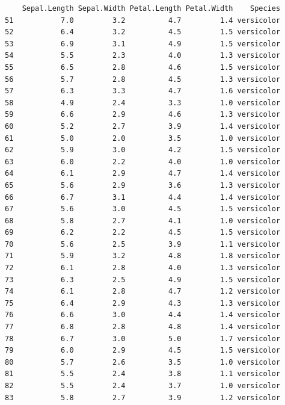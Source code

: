\documentclass[
  letterpaper,
]{book}
\newenvironment{Shaded}{\begin{snugshade}}{\end{snugshade}}
\newcommand{\NormalTok}[1]{\textcolor[rgb]{0.00,0.23,0.31}{#1}}
\newcommand{\SpecialCharTok}[1]{\textcolor[rgb]{0.37,0.37,0.37}{#1}}
\newcommand{\StringTok}[1]{\textcolor[rgb]{0.13,0.47,0.30}{#1}}
\begin{document}
\begin{Shaded}
\end{Shaded}

\begin{verbatim}
    Sepal.Length Sepal.Width Petal.Length Petal.Width    Species
51           7.0         3.2          4.7         1.4 versicolor
52           6.4         3.2          4.5         1.5 versicolor
53           6.9         3.1          4.9         1.5 versicolor
54           5.5         2.3          4.0         1.3 versicolor
55           6.5         2.8          4.6         1.5 versicolor
56           5.7         2.8          4.5         1.3 versicolor
57           6.3         3.3          4.7         1.6 versicolor
58           4.9         2.4          3.3         1.0 versicolor
59           6.6         2.9          4.6         1.3 versicolor
60           5.2         2.7          3.9         1.4 versicolor
61           5.0         2.0          3.5         1.0 versicolor
62           5.9         3.0          4.2         1.5 versicolor
63           6.0         2.2          4.0         1.0 versicolor
64           6.1         2.9          4.7         1.4 versicolor
65           5.6         2.9          3.6         1.3 versicolor
66           6.7         3.1          4.4         1.4 versicolor
67           5.6         3.0          4.5         1.5 versicolor
68           5.8         2.7          4.1         1.0 versicolor
69           6.2         2.2          4.5         1.5 versicolor
70           5.6         2.5          3.9         1.1 versicolor
71           5.9         3.2          4.8         1.8 versicolor
72           6.1         2.8          4.0         1.3 versicolor
73           6.3         2.5          4.9         1.5 versicolor
74           6.1         2.8          4.7         1.2 versicolor
75           6.4         2.9          4.3         1.3 versicolor
76           6.6         3.0          4.4         1.4 versicolor
77           6.8         2.8          4.8         1.4 versicolor
78           6.7         3.0          5.0         1.7 versicolor
79           6.0         2.9          4.5         1.5 versicolor
80           5.7         2.6          3.5         1.0 versicolor
81           5.5         2.4          3.8         1.1 versicolor
82           5.5         2.4          3.7         1.0 versicolor
83           5.8         2.7          3.9         1.2 versicolor

\end{verbatim}
\end{document}
